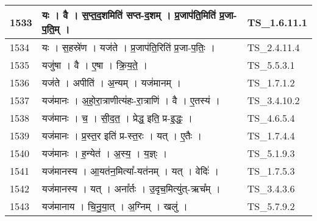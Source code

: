 \documentclass[17pt]{extarticle}
\begin{document}
\begin{longtable}{||p{0.4in}||p{4.9in}||p{0.9in}||}
    \hline
        
    1533 & यः   ।   वै   ।   स॒प्त॒द॒शमिति॑ सप्त{-}द॒शम्   ।   प्र॒जाप॑ति॒मिति॑ प्र॒जा{-}प॒ति॒म्   ।    & TS\_1.6.11.1       \\
    
    \hline
        
    1534 & यः   ।   स॒हस्रे॑ण   ।   यज॑ते   ।   प्र॒जाप॑ति॒रिति॑ प्र॒जा{-}प॒तिः॒   ।    & TS\_2.4.11.4       \\
    
    \hline
        
    1535 & यजु॑षा   ।   वै   ।   ए॒षा   ।   क्रि॒य॒ते॒   ।    & TS\_5.5.3.1       \\
    
    \hline
        
    1536 & यज॑ते   ।   अपीति॑   ।   अ॒न्यम्   ।   यज॑मानम्   ।    & TS\_1.7.1.2       \\
    
    \hline
        
    1537 & यज॑मानः   ।   अ॒हो॒रा॒त्राणीत्य॑हः{-}रा॒त्राणि॑   ।   वै   ।   ए॒तस्य॑   ।    & TS\_3.4.10.2       \\
    
    \hline
        
    1538 & यज॑मानः   ।   च॒   ।   सी॒द॒त॒   ।   प्रेद्ध॒ इति॒ प्र{-}इ॒द्धः॒   ।    & TS\_4.6.5.4       \\
    
    \hline
        
    1539 & यज॑मानः   ।   प्र॒स्त॒र इति॑ प्र{-}स्त॒रः   ।   यत्   ।   ए॒तैः   ।    & TS\_1.7.4.4       \\
    
    \hline
        
    1540 & यज॑मानः   ।   ह॒न्येत॑   ।   अ॒स्य॒   ।   य॒ज्ञ्ः   ।    & TS\_5.1.9.3       \\
    
    \hline
        
    1541 & यज॑मानस्य   ।   आ॒यत॑न॒मित्या᳚{-}यत॑नम्   ।   यत्   ।   वेदिः॑   ।    & TS\_1.7.5.3       \\
    
    \hline
        
    1542 & यज॑मानस्य   ।   यत्   ।   अना᳚र्तः   ।   उ॒दृच॒मित्यु॑त्{-}ऋच᳚म्   ।    & TS\_3.4.3.6       \\
    
    \hline
        
    1543 & यज॑मानाय   ।   चि॒नु॒या॒त्   ।   अ॒ग्निम्   ।   खलु॑   ।    & TS\_5.7.9.2       \\
    

\end{longtable}
\end{document}
